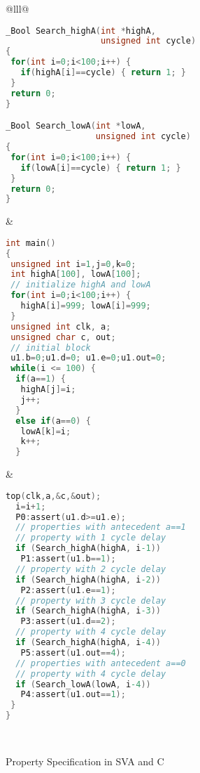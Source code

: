 \begin{figure*}[bth]
\small
\begin{center}
\begin{tabular}{@{}lll@{}}
\hline
\begin{lstlisting}[boxpos=t,mathescape=true,language=C,basicstyle=\scriptsize\ttfamily]
_Bool Search_highA(int *highA, 
                   unsigned int cycle)
{
 for(int i=0;i<100;i++) { 
   if(highA[i]==cycle) { return 1; }
 }
 return 0;
} 

_Bool Search_lowA(int *lowA, 
                  unsigned int cycle)
{
 for(int i=0;i<100;i++) { 
   if(lowA[i]==cycle) { return 1; }
 }
 return 0;
} 
\end{lstlisting}
&
\begin{lstlisting}[boxpos=t,mathescape=true,language=C,basicstyle=\scriptsize\ttfamily]
int main() 
{
 unsigned int i=1,j=0,k=0;
 int highA[100], lowA[100];
 // initialize highA and lowA
 for(int i=0;i<100;i++) { 
   highA[i]=999; lowA[i]=999;
 }
 unsigned int clk, a;
 unsigned char c, out;
 // initial block 
 u1.b=0;u1.d=0; u1.e=0;u1.out=0; 
 while(i <= 100) {
  if(a==1) {  
   highA[j]=i; 
   j++;
  } 
  else if(a==0) {
   lowA[k]=i;
   k++;
  }
\end{lstlisting}
& 
\begin{lstlisting}[boxpos=t,mathescape=true,language=C,basicstyle=\scriptsize\ttfamily]
  top(clk,a,&c,&out);
  i=i+1; 
  P0:assert(u1.d>=u1.e);
  // properties with antecedent a==1 
  // property with 1 cycle delay
  if (Search_highA(highA, i-1)) 
   P1:assert(u1.b==1);
  // property with 2 cycle delay
  if (Search_highA(highA, i-2))
   P2:assert(u1.e==1); 
  // property with 3 cycle delay
  if (Search_highA(highA, i-3))
   P3:assert(u1.d==2); 
  // property with 4 cycle delay
  if (Search_highA(highA, i-4))
   P5:assert(u1.out==4); 
  // properties with antecedent a==0
  // property with 4 cycle delay
  if (Search_lowA(lowA, i-4)) 
   P4:assert(u1.out==1);
 }
}
\end{lstlisting}\\
\hline
\end{tabular}
	\caption{Property Specification in SVA and C}
\label{fig:sva}
\end{center}
\end{figure*}


